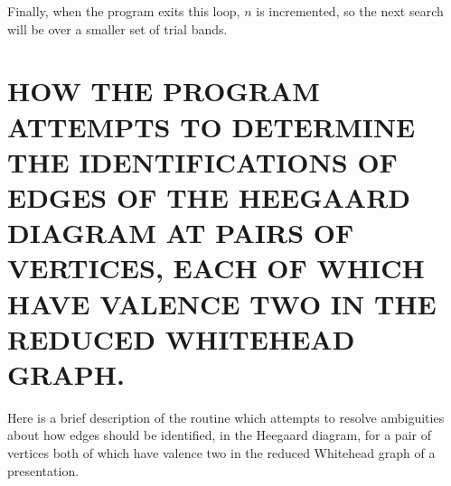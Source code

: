 \documentclass[12pt]{amsart}
\begin{document}
                Finally, when the program exits this loop, $n$ is incremented, so the next search will
        be over a smaller set of trial bands.   
                        
        
\section{HOW THE PROGRAM ATTEMPTS TO DETERMINE THE IDENTIFICATIONS OF  EDGES OF THE HEEGAARD DIAGRAM AT PAIRS OF VERTICES, EACH OF  WHICH HAVE VALENCE TWO IN THE REDUCED WHITEHEAD GRAPH.}
        
        
                Here is a brief description of the routine which attempts to resolve ambiguities
        about how edges should be identified, in the Heegaard diagram, for a pair of vertices
        both of which have valence two in the reduced Whitehead graph of a presentation.
        
\end{document}
